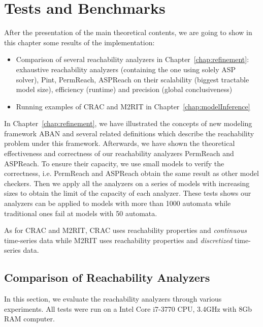 \chapter{Tests and Benchmarks}\label{chap:test}
\begin{mybox}
After the presentation of the main theoretical contents, we are going to show in this chapter some results of the implementation:

\begin{itemize}
    \item Comparison of several reachability analyzers in Chapter~\ref{chap:refinement}: exhaustive reachability analyzers (containing the one using solely ASP solver), Pint, PermReach, ASPReach on their scalability (biggest tractable model size), efficiency (runtime) and precision (global conclusiveness)
    \item Running examples of CRAC and M2RIT in Chapter~\ref{chap:modelInference}
\end{itemize}
\end{mybox}

In Chapter~\ref{chap:refinement}, we have illustrated the concepts of new modeling framework ABAN and several related definitions which describe the reachability problem under this framework.
Afterwards, we have shown the theoretical effectiveness and correctness of our reachability analyzers PermReach and ASPReach. 
To ensure their capacity, we use small models to verify the correctness, i.e. PermReach and ASPReach obtain the same result as other model checkers.
Then we apply all the analyzers on a series of models with increasing sizes to obtain the limit of the capacity of each analyzer.
These tests shows our analyzers can be applied to models with more than 1000 automata while traditional ones fail at models with 50 automata.

As for CRAC and M2RIT, CRAC uses reachability properties and \textit{continuous} time-series data while M2RIT uses reachability properties and \textit{discretized} time-series data.


\section{Comparison of Reachability Analyzers}
In this section, we evaluate the reachability analyzers through various experiments.
All tests were run on a Intel Core i7-3770 CPU, \@3.4GHz with 8Gb RAM computer.

